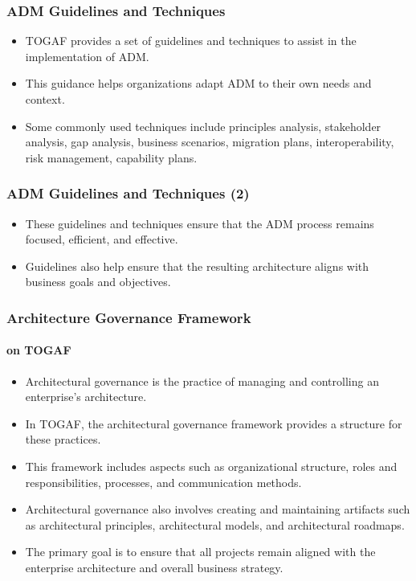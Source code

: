 \documentclass[aspectratio=169, table]{beamer}
\begin{document}
    \begin{frame}
        \frametitle{ADM Guidelines and Techniques}
        \begin{itemize}
            \item TOGAF provides a set of guidelines and techniques to assist in the implementation of ADM.
            \item This guidance helps organizations adapt ADM to their own needs and context.
            \item Some commonly used techniques include principles analysis, stakeholder analysis, gap analysis, business scenarios, migration plans, interoperability, risk management, capability plans.
        \end{itemize}
    \end{frame}

    \begin{frame}
        \frametitle{ADM Guidelines and Techniques (2)}
        \begin{itemize}
            \item These guidelines and techniques ensure that the ADM process remains focused, efficient, and effective.
            \item Guidelines also help ensure that the resulting architecture aligns with business goals and objectives.
        \end{itemize}
    \end{frame}

    \begin{frame}
        \frametitle{Architecture Governance Framework }
        \framesubtitle{on TOGAF}
        \vspace{20pt}
        \begin{itemize}
            \item Architectural governance is the practice of managing and controlling an enterprise's architecture.
            \item In TOGAF, the architectural governance framework provides a structure for these practices.
            \item This framework includes aspects such as organizational structure, roles and responsibilities, processes, and communication methods.
            \item Architectural governance also involves creating and maintaining artifacts such as architectural principles, architectural models, and architectural roadmaps.
            \item The primary goal is to ensure that all projects remain aligned with the enterprise architecture and overall business strategy.
        \end{itemize}
    \end{frame}
\end{document}
